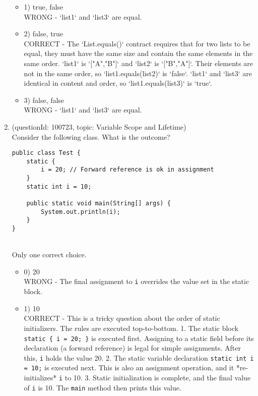 \documentclass[12pt]{article}
\begin{document}
\begin{enumerate}[label=(\arabic*)]
\begin{itemize}
\item 1) true, false
 \\ 
WRONG - `list1` and `list3` are equal.

\item 2) false, true
 \\ 
CORRECT - The `List.equals()` contract requires that for two lists to be equal, they must have the same size and contain the same elements in the same order. `list1` is `["A","B"]` and `list2` is `["B","A"]`. Their elements are not in the same order, so `list1.equals(list2)` is `false`. `list1` and `list3` are identical in content and order, so `list1.equals(list3)` is `true`.

\item 3) false, false
 \\ 
WRONG - `list1` and `list3` are equal.

\end{itemize}
\item (questionId: 100723, topic: Variable Scope and Lifetime) \\ 
Consider the following class. What is the outcome?\n\begin{verbatim}
public class Test {
    static {
        i = 20; // Forward reference is ok in assignment
    }
    static int i = 10;

    public static void main(String[] args) {
        System.out.println(i);
    }
}
\end{verbatim}
\\ \noindent Only one correct choice. 
\begin{itemize}
\item 0) 20
 \\ 
WRONG - The final assignment to \verb|i| overrides the value set in the static block.

\item 1) 10
 \\ 
CORRECT - This is a tricky question about the order of static initializers. The rules are executed top-to-bottom.
1. The static block \verb|static { i = 20; }| is executed first. Assigning to a static field before its declaration (a forward reference) is legal for simple assignments. After this, \verb|i| holds the value 20.
2. The static variable declaration \verb|static int i = 10;| is executed next. This is also an assignment operation, and it *re-initializes* \verb|i| to 10.
3. Static initialization is complete, and the final value of \verb|i| is 10. The \verb|main| method then prints this value.


\end{itemize}
\end{enumerate}
\end{document}
